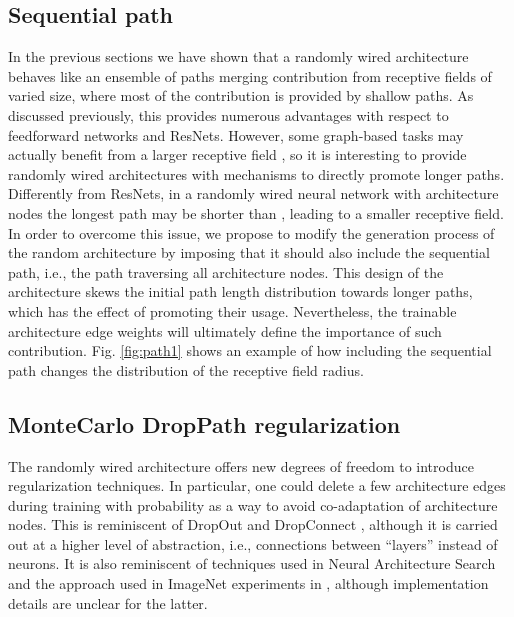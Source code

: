 \documentclass[10pt,twocolumn,twoside]{IEEEtran}
\begin{document}
\subsection{Sequential path}
In the previous sections we have shown that a randomly wired architecture behaves like an ensemble of paths merging contribution from receptive fields of varied size, where most of the contribution is provided by shallow paths. As discussed previously, this provides numerous advantages with respect to feedforward networks and ResNets. However, some graph-based tasks may actually benefit from a larger receptive field \cite{li2019deepgcns}, so it is interesting to provide randomly wired architectures with mechanisms to directly promote longer paths. Differently from ResNets, in a randomly wired neural network with  architecture nodes the longest path may be shorter than , leading to a smaller receptive field. In order to overcome this issue, we propose to modify the generation process of the random architecture by imposing that it should also include the sequential path, i.e., the path traversing all architecture nodes. This design of the architecture skews the initial path length distribution towards longer paths, which has the effect of promoting their usage. Nevertheless, the trainable architecture edge weights will ultimately define the importance of such contribution. Fig. \ref{fig:path1} shows an example of how including the sequential path changes the distribution of the receptive field radius.


\subsection{MonteCarlo DropPath regularization} \label{sec:droppath}

The randomly wired architecture offers new degrees of freedom to introduce regularization techniques. In particular, one could delete a few architecture edges during training with probability  as a way to avoid co-adaptation of architecture nodes. This is reminiscent of DropOut \cite{srivastava2014dropout} and DropConnect \cite{wan2013regularization}, although it is carried out at a higher level of abstraction, i.e., connections between ``layers'' instead of neurons. It is also reminiscent of techniques used in Neural Architecture Search \cite{zoph2018learning} and the approach used in ImageNet experiments in \cite{xie2019exploring}, although implementation details are unclear for the latter. 
\end{document}
